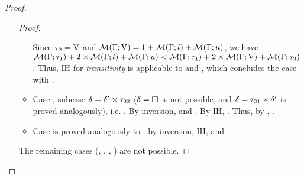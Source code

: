 \begin{proof}
\begin{itemize}
\begin{proof}
\begin{itemize}
                        Since $\tau_2 = \mathrm{V}$ and $\operatorname{\mathcal{M}}(\Gamma;\mathrm{V}) = 
                        1 + \operatorname{\mathcal{M}}(\Gamma;l) + \operatorname{\mathcal{M}}(\Gamma;u)$, we have
                        $\operatorname{\mathcal{M}}(\Gamma;\tau_1) + 2\times\operatorname{\mathcal{M}}(\Gamma;l) + 
                        \operatorname{\mathcal{M}}(\Gamma;u) < \operatorname{\mathcal{M}}(\Gamma;\tau_1) + 
                        2\times\operatorname{\mathcal{M}}(\Gamma;\mathrm{V}) + \operatorname{\mathcal{M}}(\Gamma;\tau_3)$. Thus,
                        IH for \emph{transitivity} is applicable to 
                         and \subtydflt{\tylb}{\tyub},
                        which concludes the case with .
                    \item Case , subcase
                        $\delta = \delta' \times \tau_{22}$
                        ($\delta = \square$ is not possible, and
                        $\delta = \tau_{21} \times \delta'$
                        is proved analogously), i.e.
                        \subtydflt
                            {}
                            {}.
                        By inversion, 
                        and .
                        By IH, .
                        Thus, by ,
                        \subtydflt
                            {}
                            {}.
                    \item Case  is proved analogously 
                        to : by inversion, IH, and .
                \end{itemize}
                The remaining cases
                (, , , ) 
                are not possible.
            \end{proof}


\end{itemize}
\end{proof}
